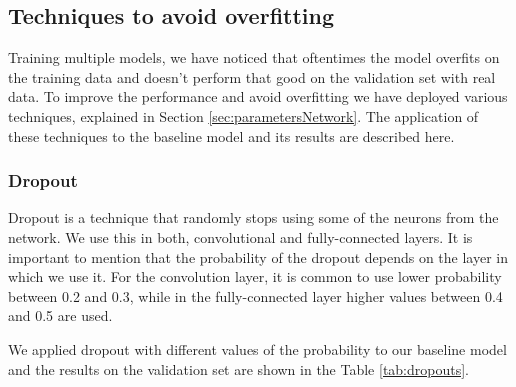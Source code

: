 \subsection{Techniques to avoid overfitting} 

Training multiple models, we have noticed that oftentimes the model overfits on the training data and doesn't perform that good on the validation set with real data. To improve the performance and avoid overfitting we have deployed various techniques, explained in Section \ref{sec:parametersNetwork}. The application of these techniques to the baseline model and its results are described here. 

\subsubsection{Dropout}

Dropout is a technique that randomly stops using some of the neurons from the network. We use this in both, convolutional and fully-connected layers. It is important to mention that the probability of the dropout depends on the layer in which we use it. For the convolution layer, it is common to use lower probability between 0.2 and 0.3, while in the fully-connected layer higher values between 0.4 and 0.5 are used.

We applied dropout with different values of the probability to our baseline model and the results on the validation set are shown in the Table \ref{tab:dropouts}. 

